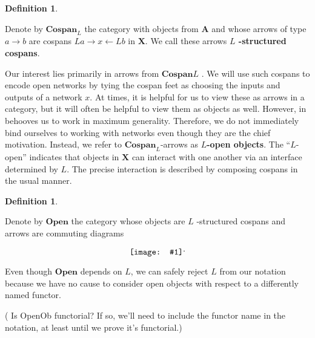 \documentclass{amsart}
\newcommand{\A}{\cat{A}}
\newcommand{\X}{\cat{X}}
\newcommand{\defn}[1]{\textbf{#1}}
\newcommand{\cat}[1]{\mathbf{#1}}
\newcommand{\diagram}[1]{\raisebox{-0.5\height}{\texttt{[image: \#1]}}}
\newcommand{\Cospan}{\mathbf{Cospan}}
\newcommand{\OpenOb}{\mathbf{Open} }
\newcommand{\edit}[1]{\textcolor{editcolour}{(#1)}}
\newenvironment{exposition}[1]{}{}
\theoremstyle{remark}
\theoremstyle{definition}
\newtheorem{definition}[theorem]{Definition}
\begin{document}
\begin{definition}
  \label{df:struct-cospan}

  Denote by \( \Cospan_L \) the category with objects from \( \A \)
  and whose arrows of type \( a \to b \) are cospans
  \( La \to x \gets Lb \) in \( \X \). We call these arrows \defn{
    \( L \) -structured cospans}.
  
\end{definition}


\begin{exposition}{}

  Our interest lies primarily in arrows from \( \Cospan L \) .  We
  will use such cospans to encode open networks by tying the cospan
  feet as choosing the inputs and outputs of a network $ x $. At
  times, it is helpful for us to view these as arrows in a category,
  but it will often be helpful to view them as objects as well.
  However, in behooves us to work in maximum generality. Therefore, we
  do not immediately bind ourselves to working with networks even
  though they are the chief motivation.  Instead, we refer to
  $ \Cospan_L $-arrows as \defn{$ L $-open objects}.
  The ``\( L \)-open'' indicates that objects in $ \X $ can
  interact with one another via an interface determined by
  $ L $.  The precise interaction is described by composing
  cospans in the usual manner.

\end{exposition}

\begin{definition}
  \label{df:open-objects}
  
  Denote by $ \OpenOb $ the category whose objects are \( L \)
  -structured cospans and arrows are commuting diagrams
  \[
    \diagram{diag_openob_openob-arrow}.
  \]
  
  Even though \( \OpenOb \) depends on \( L \), we can safely reject
  \( L \) from our notation because we have no cause to consider open
  objects with respect to a differently named functor.

  \edit{ Is OpenOb functorial? If so, we'll need to include the
    functor name in the notation, at least until we prove it's functorial.}

        
\end{definition}
\end{document}
